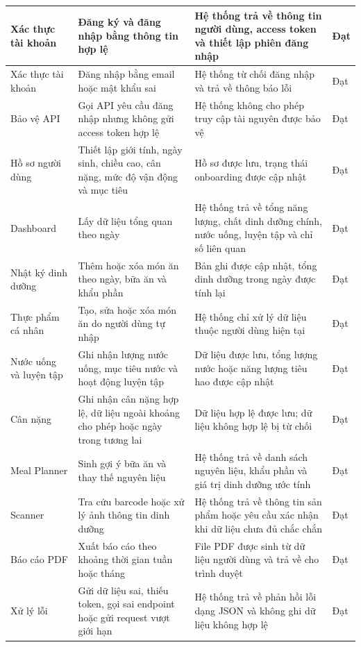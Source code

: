 \documentclass[12pt, a4paper]{report}
\begin{document}
\begin{longtable}{|>{\raggedright\arraybackslash}p{3cm}|>{\raggedright\arraybackslash}p{3cm}|>{\raggedright\arraybackslash}p{4cm}|>{\raggedright\arraybackslash}p{5cm}|}
Xác thực tài khoản & Đăng ký và đăng nhập bằng thông tin hợp lệ & Hệ thống trả về thông tin người dùng, access token và thiết lập phiên đăng nhập & Đạt \\
\hline
Xác thực tài khoản & Đăng nhập bằng email hoặc mật khẩu sai & Hệ thống từ chối đăng nhập và trả về thông báo lỗi & Đạt \\
\hline
Bảo vệ API & Gọi API yêu cầu đăng nhập nhưng không gửi access token hợp lệ & Hệ thống không cho phép truy cập tài nguyên được bảo vệ & Đạt \\
\hline
Hồ sơ người dùng & Thiết lập giới tính, ngày sinh, chiều cao, cân nặng, mức độ vận động và mục tiêu & Hồ sơ được lưu, trạng thái onboarding được cập nhật & Đạt \\
\hline
Dashboard & Lấy dữ liệu tổng quan theo ngày & Hệ thống trả về tổng năng lượng, chất dinh dưỡng chính, nước uống, luyện tập và chỉ số liên quan & Đạt \\
\hline
Nhật ký dinh dưỡng & Thêm hoặc xóa món ăn theo ngày, bữa ăn và khẩu phần & Bản ghi được cập nhật, tổng dinh dưỡng trong ngày được tính lại & Đạt \\
\hline
Thực phẩm cá nhân & Tạo, sửa hoặc xóa món ăn do người dùng tự nhập & Hệ thống chỉ xử lý dữ liệu thuộc người dùng hiện tại & Đạt \\
\hline
Nước uống và luyện tập & Ghi nhận lượng nước uống, mục tiêu nước và hoạt động luyện tập & Dữ liệu được lưu, tổng lượng nước hoặc năng lượng tiêu hao được cập nhật & Đạt \\
\hline
Cân nặng & Ghi nhận cân nặng hợp lệ, dữ liệu ngoài khoảng cho phép hoặc ngày trong tương lai & Dữ liệu hợp lệ được lưu; dữ liệu không hợp lệ bị từ chối & Đạt \\
\hline
Meal Planner & Sinh gợi ý bữa ăn và thay thế nguyên liệu & Hệ thống trả về danh sách nguyên liệu, khẩu phần và giá trị dinh dưỡng ước tính & Đạt \\
\hline
Scanner & Tra cứu barcode hoặc xử lý ảnh thông tin dinh dưỡng & Hệ thống trả về thông tin sản phẩm hoặc yêu cầu xác nhận khi dữ liệu chưa đủ chắc chắn & Đạt \\
\hline
Báo cáo PDF & Xuất báo cáo theo khoảng thời gian tuần hoặc tháng & File PDF được sinh từ dữ liệu người dùng và trả về cho trình duyệt & Đạt \\
\hline
Xử lý lỗi & Gửi dữ liệu sai, thiếu token, gọi sai endpoint hoặc gửi request vượt giới hạn & Hệ thống trả về phản hồi lỗi dạng JSON và không ghi dữ liệu không hợp lệ & Đạt \\
\hline
\end{longtable}
\end{document}

